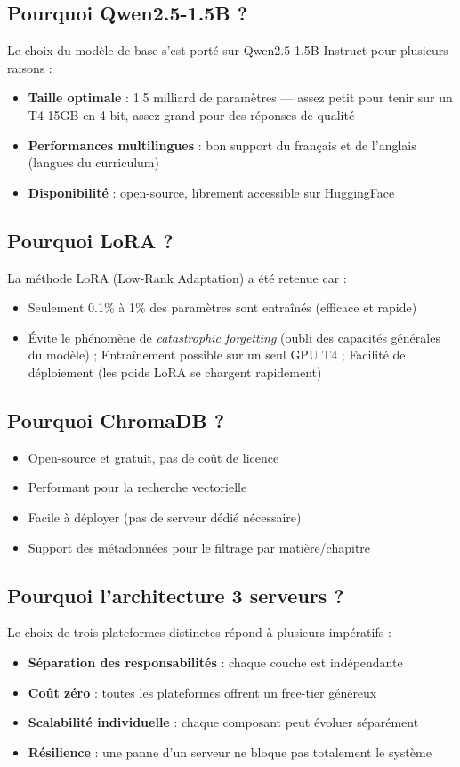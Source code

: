 \documentclass[12pt,a4paper]{report}
\begin{document}
\subsection{Pourquoi Qwen2.5-1.5B ?}
Le choix du modèle de base s'est porté sur Qwen2.5-1.5B-Instruct pour plusieurs raisons :
\begin{itemize}
    \item \textbf{Taille optimale} : 1.5 milliard de paramètres — assez petit pour tenir sur un T4 15GB en 4-bit, assez grand pour des réponses de qualité
    \item \textbf{Performances multilingues} : bon support du français et de l'anglais (langues du curriculum)
    \item \textbf{Disponibilité} : open-source, librement accessible sur HuggingFace
\end{itemize}

\subsection{Pourquoi LoRA ?}
La méthode LoRA (Low-Rank Adaptation) a été retenue car :
\begin{itemize}
    \item Seulement 0.1\% à 1\% des paramètres sont entraînés (efficace et rapide)
    \item Évite le phénomène de \textit{catastrophic forgetting} (oubli des capacités générales du modèle)
    \ite; Entraînement possible sur un seul GPU T4
    \ite; Facilité de déploiement (les poids LoRA se chargent rapidement)
\end{itemize}

\subsection{Pourquoi ChromaDB ?}
\begin{itemize}
    \item Open-source et gratuit, pas de coût de licence
    \item Performant pour la recherche vectorielle
    \item Facile à déployer (pas de serveur dédié nécessaire)
    \item Support des métadonnées pour le filtrage par matière/chapitre
\end{itemize}

\subsection{Pourquoi l'architecture 3 serveurs ?}
Le choix de trois plateformes distinctes répond à plusieurs impératifs :
\begin{itemize}
    \item \textbf{Séparation des responsabilités} : chaque couche est indépendante
    \item \textbf{Coût zéro} : toutes les plateformes offrent un free-tier généreux
    \item \textbf{Scalabilité individuelle} : chaque composant peut évoluer séparément
    \item \textbf{Résilience} : une panne d'un serveur ne bloque pas totalement le système
\end{itemize}
\end{document}
